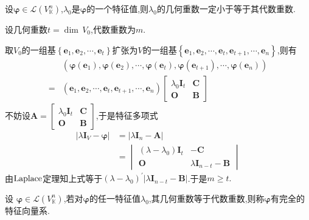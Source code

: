 \begin{green}
\begin{lemma}[代数重数与几何重数的关系]\label{lem:代数重数与几何重数的关系}
    设$
    \bm{\varphi}\in \mathcal{L}\left(
        V_{\mathbb{K}}^n
    \right)
    $,$\lambda_0$是$\bm{\varphi}$的一个特征值,则$\lambda_0$的几何重数一定小于等于其代数重数.
\end{lemma}
\begin{Proof}
设几何重数$t=\dim\,V_0$,代数重数为$m$.

取$V_0$的一组基$\left\{
    \bm{e}_1    ,\bm{e}_2,\cdots,\bm{e}_t
\right\}$扩张为$V$的一组基$\left\{
    \bm{e}_1,\bm{e}_2,\cdots,\bm{e}_t,\bm{e}_{t+1},\cdots,\bm{e}_n  
\right\}$,则有
\begin{align*}
   & \left(
     \bm{\varphi}\left(
            \bm{e}_1 
     \right),
        \bm{\varphi}\left(
                \bm{e}_2
        \right),
        \cdots,
        \bm{\varphi}\left(
                \bm{e}_t
        \right),
        \bm{\varphi}\left(
                \bm{e}_{t+1}
        \right),
        \cdots,
        \bm{\varphi}\left(
                \bm{e}_n
                \right)
\right)\\
=&\left(
    \bm{e}_1,\bm{e}_2,\cdots,\bm{e}_t,\bm{e}_{t+1},\cdots,\bm{e}_n
\right)\begin{bmatrix}
    \lambda_0\bm{I}_t&\bm{C}\\
    \bm{O}&\bm{B}
\end{bmatrix}
\end{align*}
不妨设$\bm{A}=\begin{bmatrix}
    \lambda_0\bm{I}_t&\bm{C}\\
    \bm{O}&\bm{B}
\end{bmatrix}$,于是特征多项式
\begin{align*}
    \left|\lambda\bm{I}_V-\bm{\varphi}\right|&=
    \left|
       \lambda \bm{I}_n-\bm{A}
    \right|\\
    &=
    \begin{vmatrix}
        \left(
            \lambda-\lambda_0
        \right)\bm{I}_t&-\bm{C}\\
        \bm{O}&\lambda\bm{I}_{n-t}-\bm{B}
    \end{vmatrix}
\end{align*}
由$\textup{Laplace}$定理知上式等于$\left(
    \lambda-\lambda_0
\right)^{\prime}\left|
    \lambda\bm{I}_{n-t}-\bm{B}
\right|$.于是$m\geqslant t.$
\end{Proof}
\end{green}
\begin{formal}
\begin{definition}[完全特征向量系]\label{def:完全特征向量系}
    设
    $\bm{\varphi}\in \mathcal{L}\left(
        V_{\mathbb{K}}^n
    \right)
    $,若对$\bm{\varphi}$的任一特征值$\lambda_0$,其几何重数等于代数重数,则称$\bm{\varphi}$有完全的特征向量系.
\end{definition}
\end{formal}
